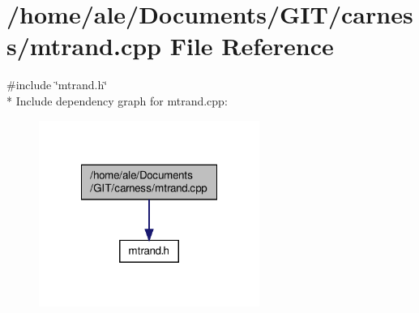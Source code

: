 \hypertarget{a00084}{\section{/home/ale/\-Documents/\-G\-I\-T/carness/mtrand.cpp File Reference}
\label{a00084}
}
{\ttfamily \#include \char`\"{}mtrand.\-h\char`\"{}}\\*
Include dependency graph for mtrand.\-cpp\-:\nopagebreak
\begin{figure}[H]
\begin{center}
\leavevmode
\includegraphics[width=204pt]{a00133}
\end{center}
\end{figure}
